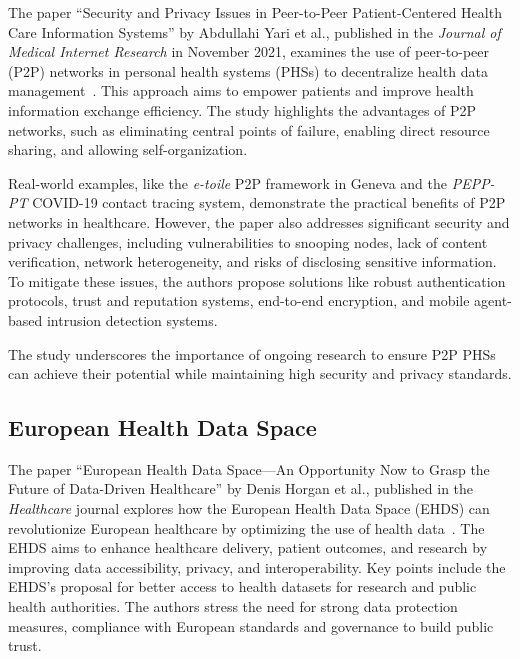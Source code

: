 The paper ``Security and Privacy Issues in Peer-to-Peer Patient-Centered Health Care Information Systems'' by Abdullahi Yari et al., published in the \textit{Journal of Medical Internet Research} in November 2021, examines the use of peer-to-peer (P2P) networks in personal health systems (PHSs) to decentralize health data management~\cite{security_engineering_p2p_environments}.
This approach aims to empower patients and improve health information exchange efficiency.
The study highlights the advantages of P2P networks, such as eliminating central points of failure, enabling direct resource sharing, and allowing self-organization.

Real-world examples, like the \textit{e-toile} P2P framework in Geneva and the \textit{PEPP-PT} COVID-19 contact tracing system, demonstrate the practical benefits of P2P networks in healthcare.
However, the paper also addresses significant security and privacy challenges, including vulnerabilities to snooping nodes, lack of content verification, network heterogeneity, and risks of disclosing sensitive information.
To mitigate these issues, the authors propose solutions like robust authentication protocols, trust and reputation systems, end-to-end encryption, and mobile agent-based intrusion detection systems.%

The study underscores the importance of ongoing research to ensure P2P PHSs can achieve their potential while maintaining high security and privacy standards.

\subsection{European Health Data Space}\label{subsec:european-health-data-space}

The paper ``European Health Data Space—An Opportunity Now to Grasp the Future of Data-Driven Healthcare'' by Denis Horgan et al., published in the \textit{Healthcare} journal explores how the European Health Data Space (EHDS) can revolutionize European healthcare by optimizing the use of health data~\cite{european_health_data_space}.
The EHDS aims to enhance healthcare delivery, patient outcomes, and research by improving data accessibility, privacy, and interoperability.
Key points include the EHDS's proposal for better access to health datasets for research and public health authorities.
The authors stress the need for strong data protection measures, compliance with European standards and governance to build public trust.

